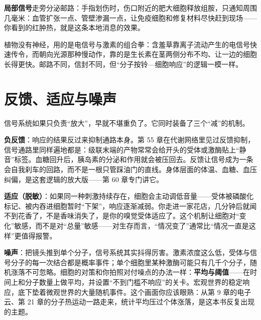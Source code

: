 \textbf{局部信号}走旁分泌邮路：手指划伤时，伤口附近的肥大细胞释放组胺，只通知周围几毫米：血管扩张一点、管壁渗漏一点，让免疫细胞和修复材料尽快赶到现场——你看到的红肿热，就是这条本地消息的效果。

植物没有神经，用的是电信号与激素的组合拳：含羞草靠离子流动产生的电信号快速传令，而朝向光源那种慢动作，靠的是生长素在茎两侧分布不均、让一边的细胞长得更快。邮路不同，信封不同，但“分子按铃—细胞响应”的逻辑一模一样。

\section{反馈、适应与噪声}

信号系统如果只负责“放大”，早就不堪重负了。它同时装备了三个“减”的机制。

\textbf{负反馈}：响应的结果反过来抑制通路本身。第 55 章在代谢网络里见过反馈抑制，信号通路里同样遍地都是：级联末端的产物常常会给开头的受体或激酶贴上“静音”标签。血糖回升后，胰岛素的分泌和作用就会被压回去。反馈让信号成为一条会自我刹车的回路，而不是一根只管踩油门的直线。身体层面的体温、血糖、血压纠偏，是这套逻辑的放大版——第 60 章专门讲它。

\textbf{适应（脱敏）}：如果同一种刺激持续存在，细胞会主动调低音量——受体被磷酸化标记、被内吞进细胞暂时“下架”，响应逐渐减弱。你走进一家花店，几分钟后就闻不到花香了，不是香味消失了，是你的嗅觉受体适应了。这个机制让细胞对“变化”敏感，而不是对“总量”敏感——对生存而言，“情况变了”通常比“情况一直是这样”更值得报警。

\textbf{噪声}：把镜头推到单个分子，信号系统其实抖得厉害。激素浓度这么低，受体与信号分子的每一次结合都是概率事件；单个细胞里某种激酶可能只有几千个分子，随机涨落不可忽略。细胞的对策和你拍照对付噪点的办法一样：\textbf{平均与阈值}——在时间上和分子数量上做平均，并设置“不到门槛不响应”的关卡。宏观世界的稳定响应，底下垫着微观世界的大量随机事件。这个画面你应该眼熟：从第 9 章的电子云、第 21 章的分子热运动一路走来，统计平均压过个体涨落，是这本书反复出现的主题。

